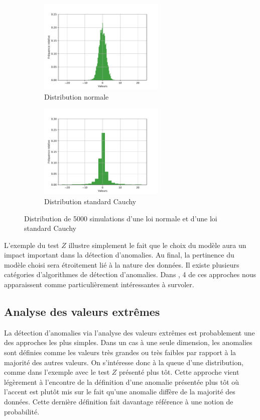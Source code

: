 \begin{figure}[htb]
	\centering
	\begin{subfigure}{6cm}
		\centering\includegraphics[width=6cm]{images/histogram-normal-ztest}
		\caption{Distribution normale}
		\label{fig:Ztest_a}
	\end{subfigure}
	\begin{subfigure}{6cm}
		\centering\includegraphics[width=6cm]{images/histogram-cauchy-ztest}
		\caption{Distribution standard Cauchy}
		\label{fig:Ztest_b}
	\end{subfigure}
	\caption{Distribution de 5000 simulations d'une loi normale et d'une loi standard Cauchy}
	\label{fig:ZTest}
\end{figure}

L'exemple du test $Z$ illustre simplement le fait que le choix du modèle aura un impact important dans la détection d'anomalies. Au final, la pertinence du modèle choisi sera étroitement lié à la nature des données. Il existe plusieurs catégories d'algorithmes de détection d'anomalies. Dans \cite{10.5555/3086742}, 4 de ces approches nous apparaissent comme particulièrement intéressantes à survoler.

\subsection{Analyse des valeurs extrêmes}

La détection d'anomalies via l'analyse des valeurs extrêmes est probablement une des approches les plus simples. Dans un cas à une seule dimension, les anomalies sont définies comme les valeurs très grandes ou très faibles par rapport à la majorité des autres valeurs. On s'intéresse donc à la queue d'une distribution, comme dans l'exemple avec le test $Z$ présenté plus tôt. Cette approche vient légèrement à l'encontre de la définition d'une anomalie présentée plus tôt où l'accent est plutôt mis sur le fait qu'une anomalie diffère de la majorité des données. Cette dernière définition fait davantage référence à une notion de probabilité.

